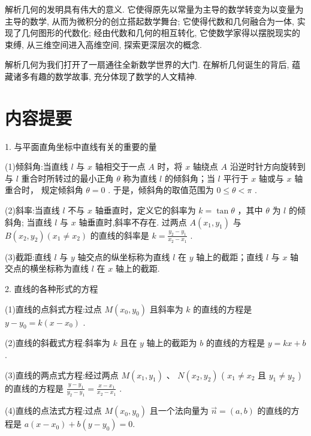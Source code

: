 \documentclass[10pt]{article}
\begin{document}
解析几何的发明具有伟大的意义. 它使得原先以常量为主导的数学转变为以变量为主导的数学, 从而为微积分的创立搭起数学舞台; 它使得代数和几何融合为一体, 实现了几何图形的代数化; 经由代数和几何的相互转化, 它使数学家得以摆脱现实的束缚, 从三维空间进入高维空间, 探索更深层次的概念.

解析几何为我们打开了一扇通往全新数学世界的大门. 在解析几何诞生的背后, 蕴藏诸多有趣的数学故事, 充分体现了数学的人文精神.

\section*{内容提要}

1. 与平面直角坐标中直线有关的重要的量

(1)倾斜角:当直线 \(l\) 与 \(x\) 轴相交于一点 \(A\) 时，将 \(x\) 轴绕点 \(A\) 沿逆时针方向旋转到与 \(l\) 重合时所转过的最小正角 \(\theta\) 称为直线 \(l\) 的倾斜角；当 \(l\) 平行于 \(x\) 轴或与 \(x\) 轴重合时， 规定倾斜角 \(\theta  = 0\) . 于是，倾斜角的取值范围为 \(0 \leq  \theta  < \pi\) .

(2)斜率:当直线 \(l\) 不与 \(x\) 轴垂直时，定义它的斜率为 \(k = \tan \theta\) ，其中 \(\theta\) 为 \(l\) 的倾斜角; 当直线 \(l\) 与 \(x\) 轴垂直时,斜率不存在. 过两点 \(A\left( {{x}_{1},{y}_{1}}\right)\) 与 \(B\left( {{x}_{2},{y}_{2}}\right) \left( {{x}_{1} \neq  {x}_{2}}\right)\) 的直线的斜率是 \(k = \frac{{y}_{2} - {y}_{1}}{{x}_{2} - {x}_{1}}\) .

(3)截距:直线 \(l\) 与 \(y\) 轴交点的纵坐标称为直线 \(l\) 在 \(y\) 轴上的截距；直线 \(l\) 与 \(x\) 轴交点的横坐标称为直线 \(l\) 在 \(x\) 轴上的截距.

2. 直线的各种形式的方程

(1)直线的点斜式方程:过点 \(M\left( {{x}_{0},{y}_{0}}\right)\) 且斜率为 \(k\) 的直线的方程是 \(y - {y}_{0} = k\left( {x - {x}_{0}}\right)\) .

(2)直线的斜截式方程:斜率为 \(k\) 且在 \(y\) 轴上的截距为 \(b\) 的直线的方程是 \(y = {kx} + b\) .

(3)直线的两点式方程:经过两点 \(M\left( {{x}_{1},{y}_{1}}\right)\) 、 \(N\left( {{x}_{2},{y}_{2}}\right)\) ( \({x}_{1} \neq  {x}_{2}\) 且 \({y}_{1} \neq  {y}_{2}\) )的直线的方程是 \(\frac{y - {y}_{1}}{{y}_{2} - {y}_{1}} = \frac{x - {x}_{1}}{{x}_{2} - {x}_{1}}\) .

(4)直线的点法式方程:过点 \(M\left( {{x}_{0},{y}_{0}}\right)\) 且一个法向量为 \(\overrightarrow{n} = \left( {a,b}\right)\) 的直线的方程是 \(a\left( {x - {x}_{0}}\right)  + b\left( {y - {y}_{0}}\right)  = 0.\)
\end{document}
